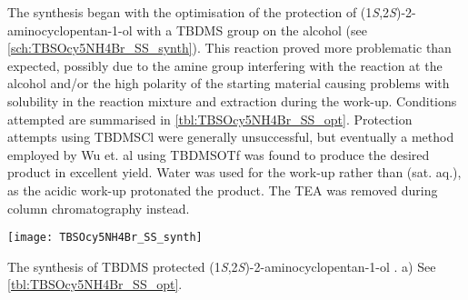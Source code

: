 
The synthesis began with the optimisation of the protection of (1\textit{S},2\textit{S})-2-aminocyclopentan-1-ol  with a TBDMS group on the alcohol (see \ref{sch:TBSOcy5NH4Br_SS_synth}).
This reaction proved more problematic than expected, possibly due to the amine group interfering with the reaction at the alcohol and/or the high polarity of the starting material causing problems with solubility in the reaction mixture and extraction during the work-up. Conditions attempted are summarised in \ref{tbl:TBSOcy5NH4Br_SS_opt}. Protection attempts using TBDMSCl were generally unsuccessful, but eventually a method employed by Wu et. al\cite{Wu2012} using TBDMSOTf was found to produce the desired product in excellent yield. Water was used for the work-up rather than  (sat. aq.), as the acidic work-up protonated the product. The TEA was removed during column chromatography instead.


\begin{scheme}[H]
	\begin{center}
		\texttt{[image: TBSOcy5NH4Br\_SS\_synth]}
		\caption{The synthesis of TBDMS protected (1\textit{S},2\textit{S})-2-aminocyclopentan-1-ol . 
		a) See \ref{tbl:TBSOcy5NH4Br_SS_opt}.
		\label{sch:TBSOcy5NH2_SS_synth}}
	\end{center}
\end{scheme}

